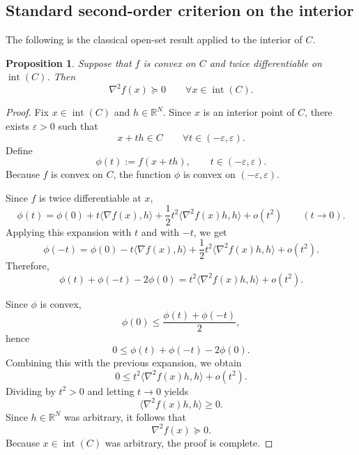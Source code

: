 \documentclass[reqno]{amsart}
\newtheorem{proposition}[theorem]{Proposition}
\theoremstyle{definition}
\newcommand{\R}{\mathbb{R}}
\newcommand{\inner}[2]{\langle #1,#2\rangle}
\begin{document}
\subsection{Standard second-order criterion on the interior}

The following is the classical open-set result applied to the interior of $C$.

\begin{proposition}\label{prop:interior-psd}
Suppose that $f$ is convex on $C$ and twice differentiable on
$\operatorname{int}(C)$. Then
\begin{equation}
    \nabla^2 f(x) \succeq 0 \qquad \forall x \in \operatorname{int}(C).
\end{equation}
\end{proposition}

\begin{proof}
Fix $x \in \operatorname{int}(C)$ and $h \in \R^N$. Since $x$ is an interior
point of $C$, there exists $\varepsilon>0$ such that
\begin{equation}
    x+th \in C \qquad \forall t \in (-\varepsilon,\varepsilon).
\end{equation}
Define
\begin{equation}
    \phi(t):=f(x+th), \qquad t \in (-\varepsilon,\varepsilon).
\end{equation}
Because $f$ is convex on $C$, the function $\phi$ is convex on
$(-\varepsilon,\varepsilon)$.

Since $f$ is twice differentiable at $x$,
\begin{equation}
    \phi(t)=\phi(0)+t\inner{\nabla f(x)}{h}
    +\dfrac12 t^2\inner{\nabla^2 f(x)h}{h}+o(t^2)
    \qquad (t \to 0).
\end{equation}
Applying this expansion with $t$ and with $-t$, we get
\begin{equation}
    \phi(-t)=\phi(0)-t\inner{\nabla f(x)}{h}
    +\dfrac12 t^2\inner{\nabla^2 f(x)h}{h}+o(t^2).
\end{equation}
Therefore,
\begin{equation}
    \phi(t)+\phi(-t)-2\phi(0)
    = t^2\inner{\nabla^2 f(x)h}{h}+o(t^2).
\end{equation}

Since $\phi$ is convex,
\begin{equation}
    \phi(0) \leq \frac{\phi(t)+\phi(-t)}{2},
\end{equation}
hence
\begin{equation}
    0 \leq \phi(t)+\phi(-t)-2\phi(0).
\end{equation}
Combining this with the previous expansion, we obtain
\begin{equation}
    0 \leq t^2\inner{\nabla^2 f(x)h}{h}+o(t^2).
\end{equation}
Dividing by $t^2>0$ and letting $t \to 0$ yields
\begin{equation}
    \inner{\nabla^2 f(x)h}{h} \geq 0.
\end{equation}
Since $h \in \R^N$ was arbitrary, it follows that
\begin{equation}
    \nabla^2 f(x) \succeq 0.
\end{equation}
Because $x \in \operatorname{int}(C)$ was arbitrary, the proof is complete.
\end{proof}
\end{document}
